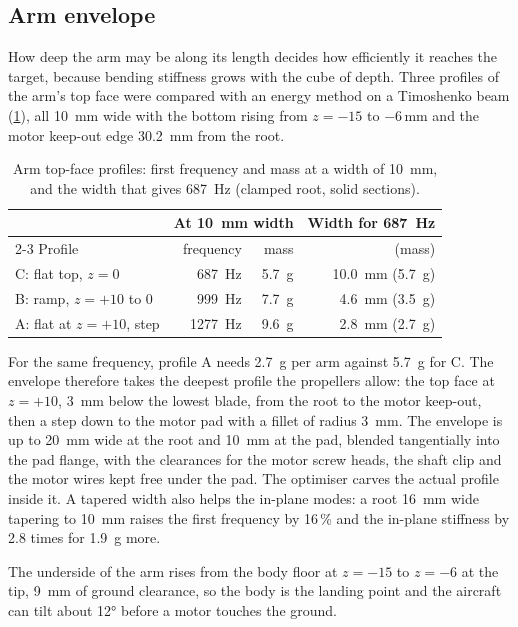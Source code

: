 \subsection{Arm envelope}

How deep the arm may be along its length decides how efficiently it reaches the target, because bending stiffness grows with the cube of depth. Three profiles of the arm's top face were compared with an energy method on a Timoshenko beam (\cref{tab:arch-profiles}), all \SI{10}{mm} wide with the bottom rising from $z = -15$ to $-6$\,mm and the motor keep-out edge \SI{30.2}{mm} from the root.

\begin{table}[htbp]
\centering\small
\caption{Arm top-face profiles: first frequency and mass at a width of \SI{10}{mm}, and the width that gives \SI{687}{Hz} (clamped root, solid sections).}\label{tab:arch-profiles}
\begin{tabular}{@{}lrrr@{}}
\toprule
 & \multicolumn{2}{c}{At \SI{10}{mm} width} & Width for \SI{687}{Hz}\\
\cmidrule(lr){2-3}
Profile & frequency & mass & (mass)\\
\midrule
C: flat top, $z = 0$ & \SI{687}{Hz} & \SI{5.7}{g} & \SI{10.0}{mm} (\SI{5.7}{g})\\
B: ramp, $z = +10$ to 0 & \SI{999}{Hz} & \SI{7.7}{g} & \SI{4.6}{mm} (\SI{3.5}{g})\\
A: flat at $z = +10$, step & \SI{1277}{Hz} & \SI{9.6}{g} & \SI{2.8}{mm} (\SI{2.7}{g})\\
\bottomrule
\end{tabular}
\end{table}

For the same frequency, profile A needs \SI{2.7}{g} per arm against \SI{5.7}{g} for C. The envelope therefore takes the deepest profile the propellers allow: the top face at $z = +10$, \SI{3}{mm} below the lowest blade, from the root to the motor keep-out, then a step down to the motor pad with a fillet of radius \SI{3}{mm}. The envelope is up to \SI{20}{mm} wide at the root and \SI{10}{mm} at the pad, blended tangentially into the pad flange, with the clearances for the motor screw heads, the shaft clip and the motor wires kept free under the pad. The optimiser carves the actual profile inside it. A tapered width also helps the in-plane modes: a root \SI{16}{mm} wide tapering to \SI{10}{mm} raises the first frequency by 16\,\% and the in-plane stiffness by 2.8 times for \SI{1.9}{g} more.

The underside of the arm rises from the body floor at $z = -15$ to $z = -6$ at the tip, \SI{9}{mm} of ground clearance, so the body is the landing point and the aircraft can tilt about \ang{12} before a motor touches the ground.

